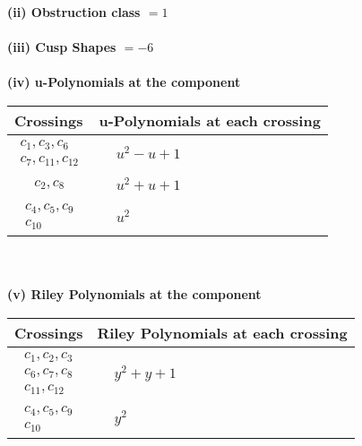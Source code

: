 \documentclass[1p]{elsarticle_modified}
\theoremstyle{definition}
\begin{document}
\flushleft \textbf{(ii) Obstruction class $= 1$}\\~\\
\flushleft \textbf{(iii) Cusp Shapes $= -6$}\\~\\
\newpage\renewcommand{\arraystretch}{1}
\flushleft \textbf{(iv) u-Polynomials at the component}\newline \\
\begin{tabular}{m{50pt}|m{274pt}}
Crossings & \hspace{64pt}u-Polynomials at each crossing \\
\hline $$\begin{aligned}c_{1},c_{3},c_{6}\\c_{7},c_{11},c_{12}\end{aligned}$$&$\begin{aligned}
&u^2- u+1
\end{aligned}$\\
\hline $$\begin{aligned}c_{2},c_{8}\end{aligned}$$&$\begin{aligned}
&u^2+u+1
\end{aligned}$\\
\hline $$\begin{aligned}c_{4},c_{5},c_{9}\\c_{10}\end{aligned}$$&$\begin{aligned}
&u^2
\end{aligned}$\\
\hline
\end{tabular}\\~\\
\newpage\renewcommand{\arraystretch}{1}
\flushleft \textbf{(v) Riley Polynomials at the component}\newline \\
\begin{tabular}{m{50pt}|m{274pt}}
Crossings & \hspace{64pt}Riley Polynomials at each crossing \\
\hline $$\begin{aligned}c_{1},c_{2},c_{3}\\c_{6},c_{7},c_{8}\\c_{11},c_{12}\end{aligned}$$&$\begin{aligned}
&y^2+y+1
\end{aligned}$\\
\hline $$\begin{aligned}c_{4},c_{5},c_{9}\\c_{10}\end{aligned}$$&$\begin{aligned}
&y^2
\end{aligned}$\\
\hline
\end{tabular}\\~\\
\end{document}
